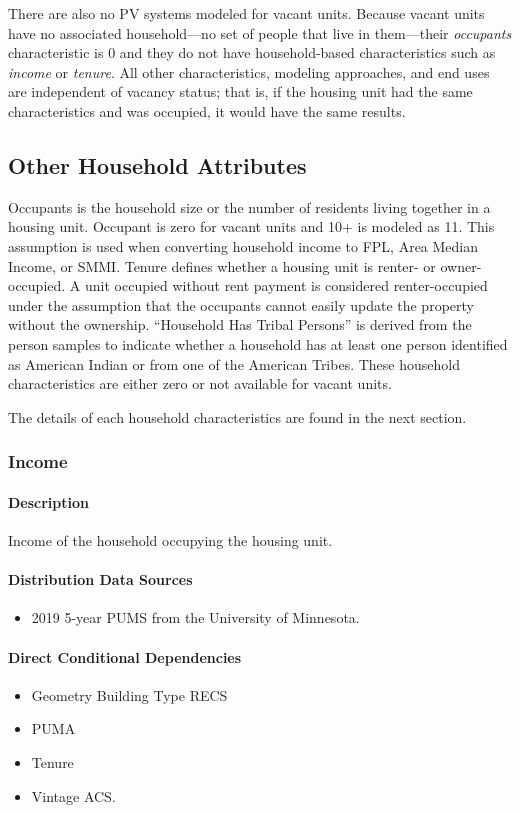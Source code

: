 There are also no PV systems modeled for vacant units. Because vacant units have no associated household---no set of people that live in them---their \textit{occupants} characteristic is 0 and they do not have household-based characteristics such as \textit{income} or \textit{tenure}. All other characteristics, modeling approaches, and end uses are independent of vacancy status; that is, if the housing unit had the same characteristics and was occupied, it would have the same results. 

\subsection{Other Household Attributes}
Occupants is the household size or the number of residents living together in a housing unit. Occupant is zero for vacant units and 10+ is modeled as 11. This assumption is used when converting household income to FPL, Area Median Income, or SMMI. Tenure defines whether a housing unit is renter- or owner-occupied. A unit occupied without rent payment is considered renter-occupied under the assumption that the occupants cannot easily update the property without the ownership. ``Household Has Tribal Persons'' is derived from the person samples to indicate whether a household has at least one person identified as American Indian or from one of the American Tribes. These household characteristics are either zero or not available for vacant units.

The details of each household characteristics are found in the next section.

\subsubsection{Income}\label{income}
\paragraph{Description}
Income of the household occupying the housing unit.

\paragraph{Distribution Data Sources}
\begin{itemize}
\item
  2019 5-year PUMS from the University of Minnesota.
\end{itemize}

\paragraph{Direct Conditional Dependencies}
\begin{itemize}
    \item Geometry Building Type RECS
    \item PUMA
    \item Tenure
    \item Vintage ACS.
\end{itemize}

